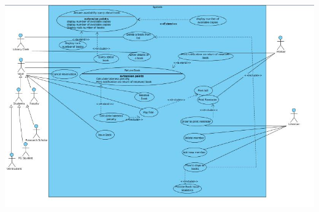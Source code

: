 \documentclass[a4paper]{article}
\begin{document}
\includegraphics[scale=0.55]{images/useCaseDiag.jpg}\\
\end{document}
